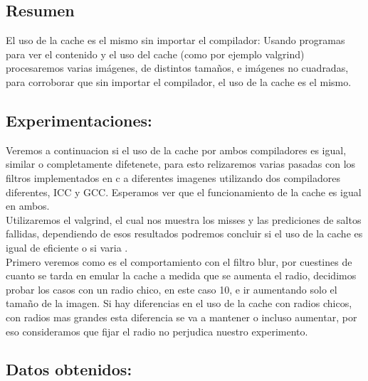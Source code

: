 \subsection{Resumen}

El uso de la cache es el mismo sin importar el compilador: Usando programas para ver el contenido y el uso del cache (como por ejemplo valgrind) procesaremos varias imágenes, de distintos tamaños, e imágenes no cuadradas, para corroborar que sin importar el compilador, el uso de la cache es el mismo. \\


\subsection{Experimentaciones:}

Veremos a continuacion si el uso de la cache por ambos compiladores es igual, similar o completamente difetenete, para esto relizaremos varias pasadas con los filtros implementados en c a diferentes imagenes utilizando dos compiladores diferentes, ICC y GCC. Esperamos ver que el funcionamiento de la cache es igual en ambos. \\

Utilizaremos el valgrind, el cual nos muestra los misses y las prediciones de saltos fallidas, dependiendo de esos resultados podremos concluir si el uso de la cache es igual de eficiente o si varia . \\

Primero veremos como es el comportamiento con el filtro blur, por cuestines de cuanto se tarda en emular la cache a medida que se aumenta el radio, decidimos probar los casos con un radio chico, en este caso 10,  e ir aumentando solo el tamaño de la imagen. Si hay diferencias en el uso de la cache con radios chicos, con radios mas grandes esta diferencia se va a mantener o incluso aumentar, por eso consideramos que fijar el radio no perjudica nuestro experimento. \\

\subsection{Datos obtenidos:}

